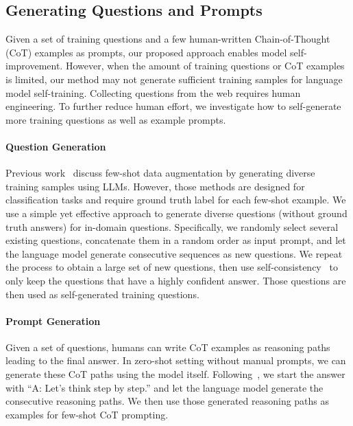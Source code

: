 \documentclass{article} %
\begin{document}


\subsection{Generating Questions and Prompts}\label{sec:q_gen}
Given a set of training questions and a few human-written Chain-of-Thought (CoT) examples as prompts, our proposed approach enables model self-improvement. However, when the amount of training questions or CoT examples is limited, our method may not generate sufficient training samples for language model self-training. Collecting questions from the web requires human engineering. 
To further reduce human effort, we investigate how to self-generate more training questions as well as example prompts. 

\paragraph{Question Generation}\label{sec:q_gen}
Previous work~\citep{Yoo2021GPT3MixLL, Meng2022GeneratingTD} discuss few-shot data augmentation by generating diverse training samples using LLMs. However, those methods are designed for classification tasks and require ground truth label for each few-shot example. We use a simple yet effective approach to generate diverse questions (without ground truth answers) for in-domain questions. Specifically, we randomly select several existing questions, concatenate them in a random order as input prompt, and let the language model generate consecutive sequences as new questions. We repeat the process to obtain a large set of new questions, then use self-consistency~\citep{Wang2022SelfConsistencyIC} to only keep the questions that have a highly confident answer. Those questions are then used as self-generated training questions.

\paragraph{Prompt Generation}
Given a set of questions, humans can write CoT examples as reasoning paths leading to the final answer. In zero-shot setting without manual prompts, we can generate these CoT paths using the model itself. Following~\cite{step_by_step}, we start the answer with ``A: Let's think step by step.'' and let the language model generate the consecutive reasoning paths. We then use those generated reasoning paths as examples for few-shot CoT prompting.
\end{document}
